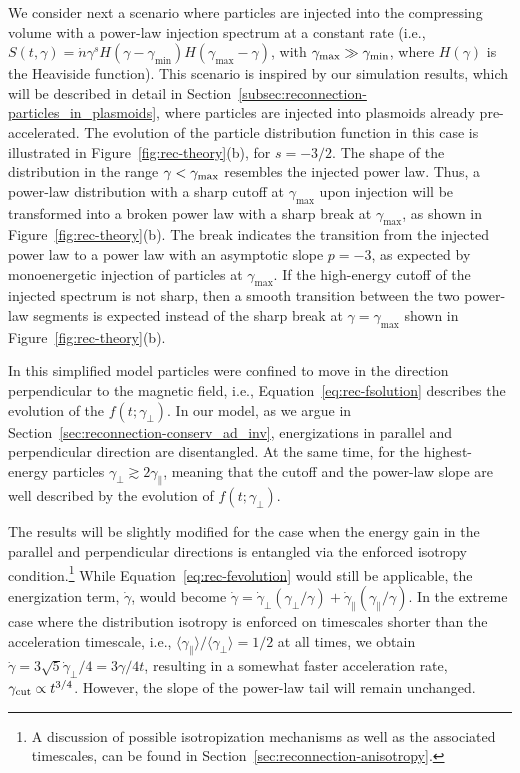 
We consider next a scenario where particles are injected into the compressing volume with a power-law injection spectrum at a constant rate (i.e., $S(t, \gamma)=\dot{n}\gamma^{s} H(\gamma - \gamma_{\min})H(\gamma_{\max}-\gamma)$, with $\gamma_{\rm max}\gg \gamma_{\rm min}$, where $H(\gamma)$ is the Heaviside function). This scenario is inspired by our simulation results, which will be described in detail in Section~\ref{subsec:reconnection-particles_in_plasmoids}, where particles are injected into plasmoids already pre-accelerated. The evolution of the particle distribution function in this case is illustrated in Figure~\ref{fig:rec-theory}(b), for $s=-3/2$. The shape of the distribution in the range $\gamma < \gamma_{\rm max}$ resembles the injected power law. Thus, a power-law distribution with a sharp cutoff at $\gamma_{\max}$ upon injection will be transformed into a broken power law with a sharp break at $\gamma_{\max}$, as shown in Figure~\ref{fig:rec-theory}(b). The break indicates the transition from the injected power law to a power law with an asymptotic slope $p=-3$, as expected by monoenergetic injection of particles at $\gamma_{\max}$. If the high-energy cutoff of the injected spectrum is not sharp, then a smooth transition between the two power-law segments is expected instead of the sharp break at $\gamma=\gamma_{\max}$ shown in Figure~\ref{fig:rec-theory}(b).

In this simplified model particles were confined to move in the direction perpendicular to the magnetic field, i.e., Equation~\eqref{eq:rec-fsolution} describes the evolution of the $f(t;\gamma_{\perp})$. In our model, as we argue in Section~\ref{sec:reconnection-conserv_ad_inv}, energizations in parallel and perpendicular direction are disentangled. At the same time, for the highest-energy particles $\gamma_{\perp} \gtrsim 2\gamma_\parallel$, meaning that the cutoff and the power-law slope are well described by the evolution of $f(t;\gamma_{\perp})$.

The results will be slightly modified for the case when the energy gain in the parallel and perpendicular directions is entangled via the enforced isotropy condition.\footnote{A discussion of possible isotropization mechanisms as well as the associated timescales, can be found in Section~\ref{sec:reconnection-anisotropy}.} While Equation~\eqref{eq:rec-fevolution} would still be applicable, the energization term, $\dot{\gamma}$, would become $\dot{\gamma} = \dot{\gamma}_{\perp} (\gamma_\perp/\gamma)+\dot{\gamma}_{\parallel} (\gamma_\parallel/\gamma)$. In the extreme case where the distribution isotropy is enforced on timescales shorter than the acceleration timescale, i.e., $\langle\gamma_\parallel\rangle/\langle\gamma_\perp\rangle=1/2$ at all times, we obtain $\dot {\gamma} = 3\sqrt{5}\dot{\gamma}_\perp/4 = 3\gamma / 4 t$, resulting in a somewhat faster acceleration rate, $\gamma_{\rm cut}\propto t^{3/4}$. However, the slope of the power-law tail will remain unchanged. 

